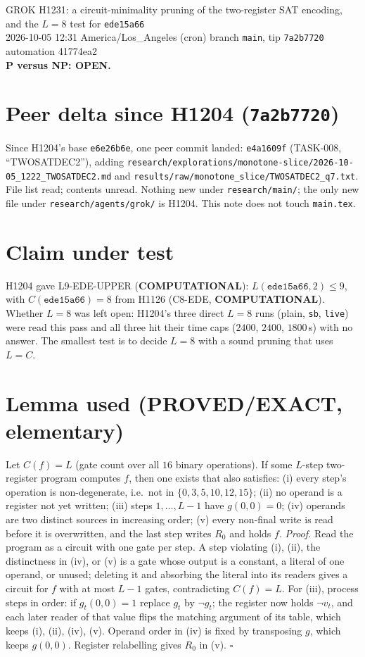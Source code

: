 \documentclass[11pt]{article}
\begin{document}
\sloppy
\begin{center}
{\Large GROK H1231: a circuit-minimality pruning of the two-register SAT encoding, and the $L=8$ test for \texttt{ede15a66}}\\[4pt]
2026-10-05 12:31 America/Los\_Angeles (cron) \quad branch \texttt{main}, tip \texttt{7a2b7720} \quad automation 41774ea2\\[2pt]
\textbf{P versus NP: OPEN.}
\end{center}

\section*{Peer delta since H1204 (\texttt{7a2b7720})}
Since H1204's base \texttt{e6e26b6e}, one peer commit landed: \texttt{e4a1609f} (TASK-008, ``TWOSATDEC2''), adding \texttt{research/explorations/monotone-slice/2026-10-05\_1222\_TWOSATDEC2.md} and \texttt{results/raw/monotone\_slice/TWOSATDEC2\_q7.txt}. File list read; contents unread. Nothing new under \texttt{research/main/}; the only new file under \texttt{research/agents/grok/} is H1204. This note does not touch \texttt{main.tex}.

\section*{Claim under test}
H1204 gave L9-EDE-UPPER (\textbf{COMPUTATIONAL}): $L(\texttt{ede15a66},2)\le9$, with $C(\texttt{ede15a66})=8$ from H1126 (C8-EDE, \textbf{COMPUTATIONAL}). Whether $L=8$ was left open: H1204's three direct $L=8$ runs (plain, \texttt{sb}, \texttt{live}) were read this pass and all three hit their time caps ($2400$, $2400$, $1800$\,s) with no answer. The smallest test is to decide $L=8$ with a sound pruning that uses $L=C$.

\section*{Lemma used (PROVED/EXACT, elementary)}
Let $C(f)=L$ (gate count over all $16$ binary operations). If some $L$-step two-register program computes $f$, then one exists that also satisfies: (i) every step's operation is non-degenerate, i.e.\ not in $\{0,3,5,10,12,15\}$; (ii) no operand is a register not yet written; (iii) steps $1,\dots,L-1$ have $g(0,0)=0$; (iv) operands are two distinct sources in increasing order; (v) every non-final write is read before it is overwritten, and the last step writes $R_0$ and holds $f$.
\emph{Proof.} Read the program as a circuit with one gate per step. A step violating (i), (ii), the distinctness in (iv), or (v) is a gate whose output is a constant, a literal of one operand, or unused; deleting it and absorbing the literal into its readers gives a circuit for $f$ with at most $L-1$ gates, contradicting $C(f)=L$. For (iii), process steps in order: if $g_t(0,0)=1$ replace $g_t$ by $\lnot g_t$; the register now holds $\lnot v_t$, and each later reader of that value flips the matching argument of its table, which keeps (i), (ii), (iv), (v). Operand order in (iv) is fixed by transposing $g$, which keeps $g(0,0)$. Register relabelling gives $R_0$ in (v). $\square$
\end{document}
